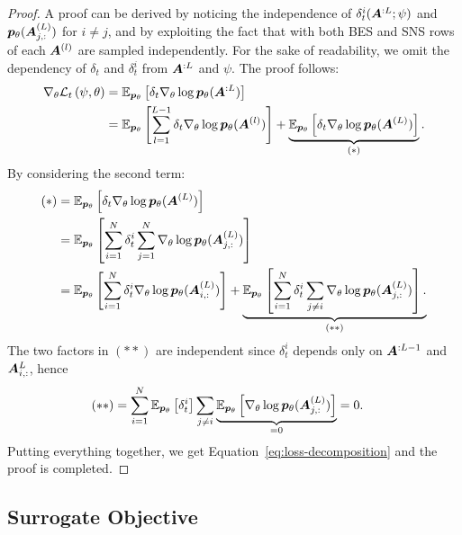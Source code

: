 \medskip
\begin{proof}
A proof can be derived by noticing the independence of $\delta_t^i({\bm{A}}^{:L}; \psi)$ and ${{\bm{p}}_\theta}({\bm{A}}^{(L)}_{j,:})$ for $i \neq j$, and by exploiting the fact that with both BES and SNS rows of each ${\bm{A}}^{(l)}$ are sampled independently. For the sake of readability, we omit the dependency of $\delta_t$ and $\delta_t^i$ from ${\bm{A}}^{:L}$ and $\psi$. The proof follows:
%
\begin{align}
    \nabla_\theta \mathcal{L}_t\left(\psi,\theta\right)
    &= \mathbb{E}_{{{\bm{p}}_\theta}} \left[\delta_t\nabla_\theta \log{{\bm{p}}_\theta}({\bm{A}}^{:L}) \right]\\
    &= \mathbb{E}_{{{\bm{p}}_\theta}} \left[\sum_{l=1}^{L-1}\delta_t\nabla_\theta \log{{\bm{p}}_\theta}({\bm{A}}^{(l)})\right] + \underbrace{\mathbb{E}_{{{\bm{p}}_\theta}} \left[\delta_t\nabla_\theta \log{{\bm{p}}_\theta}({\bm{A}}^{(L)})\right]}_{ (*)}.
\end{align}   
%
By considering the second term:
%
\begin{align}
    (*) &= \mathbb{E}_{{{\bm{p}}_\theta}} \left[\delta_t\nabla_\theta \log{{\bm{p}}_\theta}({\bm{A}}^{(L)})\right]\\
    &= \mathbb{E}_{{{\bm{p}}_\theta}} \left[\sum_{i=1}^N\delta^i_t  \sum_{j=1}^N\nabla_\theta\log{{\bm{p}}_\theta}({\bm{A}}^{(L)}_{j,:}) \right]\\
    &= \mathbb{E}_{{{\bm{p}}_\theta}} \left[\sum_{i=1}^N\delta^i_t \nabla_\theta \log{{\bm{p}}_\theta}({\bm{A}}^{(L)}_{i,:}) \right] + \underbrace{\mathbb{E}_{{{\bm{p}}_\theta}} \left[\sum_{i=1}^N\delta^i_t \sum_{j\neq i} \nabla_\theta \log{{\bm{p}}_\theta}({\bm{A}}^{(L)}_{j,:}) \right].}_{(**)}
\end{align}
%
The two factors in $(**)$ are independent since $\delta_t^i$ depends only on ${\bm{A}}^{:L-1}$ and ${\bm{A}}^L_{i,:}$, hence 
%
\begin{align}
    (**) &=\sum_{i=1}^N\mathbb{E}_{{{\bm{p}}_\theta}} \left[\delta^i_t \right]\sum_{j\neq i}\underbrace{\mathbb{E}_{{{\bm{p}}_\theta}}\left[\nabla_\theta \log{{\bm{p}}_\theta}({\bm{A}}^{(L)}_{j,:})\right]}_{=0} = 0.
\end{align}
Putting everything together, we get Equation~\eqref{eq:loss-decomposition} and the proof is completed. 
\end{proof}


\subsection{Surrogate Objective}

